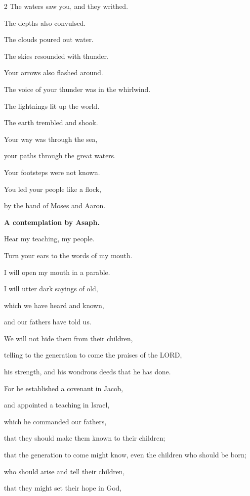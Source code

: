 \begin{multicols}{2}
	The waters saw you, and they writhed.
	
	The depths also convulsed.
	
	
	\myverse{}The clouds poured out water.
	
	The skies resounded with thunder.
	
	Your arrows also flashed around.
	
	
	\myverse{}The voice of your thunder was in the whirlwind.
	
	The lightnings lit up the world.
	
	The earth trembled and shook.
	
	
	\myverse{}Your way was through the sea,
	
	your paths through the great waters.
	
	Your footsteps were not known.
	
	
	\myverse{}You led your people like a flock,
	
	by the hand of Moses and Aaron.
	
	
	
	\mychapter{}\textbf{A contemplation by Asaph.}
	
	\quad \myverse*{}Hear my teaching, my people.
	
	Turn your ears to the words of my mouth.
	
	
	\myverse{}I will open my mouth in a parable.
	
	I will utter dark sayings of old,
	
	
	\myverse{}which we have heard and known,
	
	and our fathers have told us.
	
	
	\myverse{}We will not hide them from their children,
	
	telling to the generation to come the praises of the LORD,
	
	his strength, and his wondrous deeds that he has done.
	
	
	\myverse{}For he established a covenant in Jacob,
	
	and appointed a teaching in Israel,
	
	which he commanded our fathers,
	
	that they should make them known to their children;
	
	
	\myverse{}that the generation to come might know, even the children who
	should be born;
	
	who should arise and tell their children,
	
	
	\myverse{}that they might set their hope in God,
	

\end{multicols}
